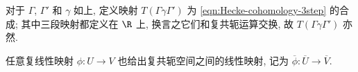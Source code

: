 
\begin{definition}
	对于 $\Gamma$, $\Gamma'$ 和 $\gamma$ 如上, 定义映射 $T(\Gamma\gamma\Gamma')$ 为 \eqref{eqn:Hecke-cohomology-3step} 的合成; 其中三段映射都定义在 $\R$ 上, 换言之它们和复共轭运算交换, 故 $T(\Gamma\gamma\Gamma')$ 亦然.
\end{definition}

任意复线性映射 $\phi: U \to V$ 也给出复共轭空间之间的线性映射, 记为 $\overline{\phi}: \overline{U} \to \overline{V}$.

